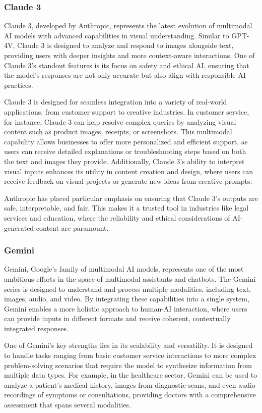 \subsubsection{Claude 3}

Claude 3, developed by Anthropic, represents the latest evolution of multimodal AI models with advanced capabilities in visual understanding. 
Similar to GPT-4V, Claude 3 is designed to analyze and respond to images alongside text, providing users with deeper insights and more context-aware interactions. 
One of Claude 3’s standout features is its focus on safety and ethical AI, ensuring that the model's responses are not only accurate but also align with responsible AI practices.

Claude 3 is designed for seamless integration into a variety of real-world applications, from customer support to creative industries. 
In customer service, for instance, Claude 3 can help resolve complex queries by analyzing visual content such as product images, receipts, or screenshots. 
This multimodal capability allows businesses to offer more personalized and efficient support, as users can receive detailed explanations or troubleshooting steps based on both the text and images they provide. 
Additionally, Claude 3’s ability to interpret visual inputs enhances its utility in content creation and design, where users can receive feedback on visual projects or generate new ideas from creative prompts.

Anthropic has placed particular emphasis on ensuring that Claude 3’s outputs are safe, interpretable, and fair. 
This makes it a trusted tool in industries like legal services and education, where the reliability and ethical considerations of AI-generated content are paramount.

\subsubsection{Gemini}

Gemini, Google’s family of multimodal AI models, represents one of the most ambitious efforts in the space of multimodal assistants and chatbots. 
The Gemini series is designed to understand and process multiple modalities, including text, images, audio, and video. 
By integrating these capabilities into a single system, Gemini enables a more holistic approach to human-AI interaction, where users can provide inputs in different formats and receive coherent, contextually integrated responses.

One of Gemini’s key strengths lies in its scalability and versatility. 
It is designed to handle tasks ranging from basic customer service interactions to more complex problem-solving scenarios that require the model to synthesize information from multiple data types. 
For example, in the healthcare sector, Gemini can be used to analyze a patient’s medical history, images from diagnostic scans, and even audio recordings of symptoms or consultations, providing doctors with a comprehensive assessment that spans several modalities.

